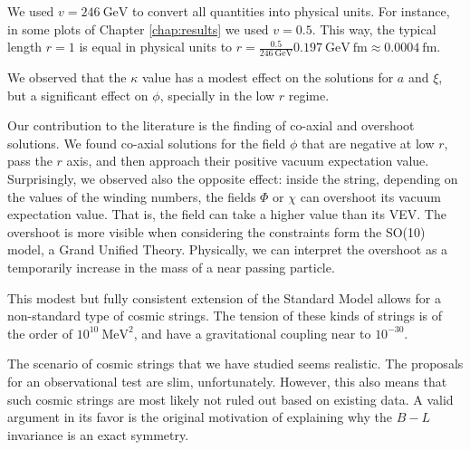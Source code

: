 We used $v=246 \ \text{GeV}$ to convert all quantities into physical units. For instance, in some plots of Chapter \ref{chap:results} we used $v=0.5$. This way, the typical length $r = 1$ is equal in physical units to $r = \frac{0.5}{246\ \text{GeV}}0.197\ \text{GeV}\ \text{fm}\approx 0.0004\ \text{fm}$.

We observed that the $\kappa$ value has a modest effect on the solutions for $a$ and $\xi$, but a significant effect on $\phi$, specially in the low $r$ regime.

Our contribution to the literature is the finding of co-axial and overshoot solutions. We found co-axial solutions for the field $\phi$ that are negative at low $r$, pass the $r$ axis, and then approach their positive vacuum expectation value. Surprisingly, we observed also the opposite effect: inside the string, depending on the values of the winding numbers, the fields $\Phi$ or $\chi$ can overshoot its vacuum expectation value. That is, the field can take a higher value than its VEV. The overshoot is more visible when considering the constraints form the SO(10) model, a Grand Unified Theory. Physically, we can interpret the overshoot as a temporarily increase in the mass of a near passing particle.

This modest but fully consistent extension of the Standard Model allows  for a non-standard type of cosmic strings. The tension of these kinds of strings is of the order of $10^{10}\ \text{MeV}^2$, and have a gravitational coupling near to $10^{-30}$.

The scenario of cosmic strings that we have studied seems realistic. The proposals for an observational test are slim, unfortunately. However, this also means that such cosmic strings are most likely not ruled out based on existing data. A valid argument in its favor is the original motivation of explaining why the $B-L$ invariance is an exact symmetry.


